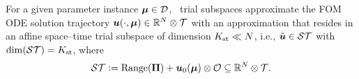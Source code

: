 \documentclass[3p,computermodern,10pt]{elsarticle}
\begin{document}
For a given parameter instance $\boldsymbol \mu \in \mathcal{D}$, \spaceTimeAcronym\ trial subspaces approximate the FOM ODE solution
trajectory
	$\boldsymbol u(\cdot,\boldsymbol \mu) \in\mathbb{R}^{N}\otimes \mathcal{T}$ with an approximation that resides in an
	affine space--time trial subspace of dimension $K_{\text{st}}\ll N$, i.e., 
	$\tilde{\boldsymbol u} \in \mathcal{ST}$ with $\dim(\mathcal{ST}) =K_{\text{st}} $, where
\begin{equation}\label{eq:sttrialspace_def}
 \mathcal{ST} \vcentcolon= 
	\text{Range}(\boldsymbol \Pi) + 
	\boldsymbol u_0(\boldsymbol \mu) \otimes \mathcal{O}
	\subseteq \mathbb{R}^{N} \otimes \mathcal{T}.
\end{equation}

\end{document}
